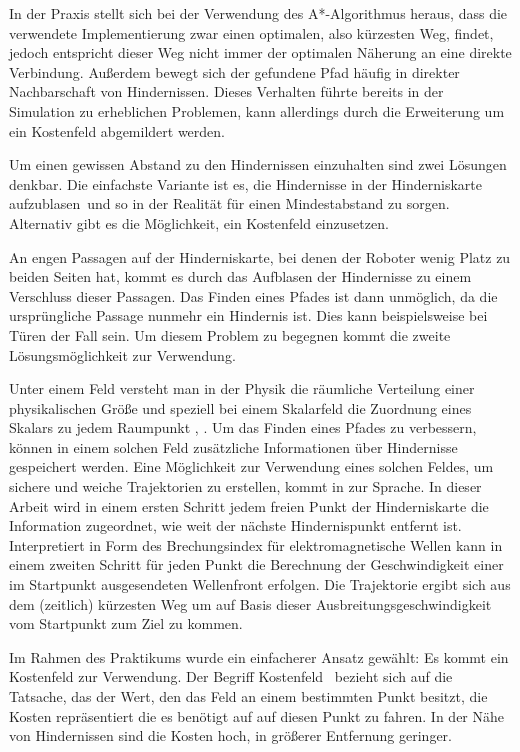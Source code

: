 In der Praxis stellt sich bei der Verwendung des A*-Algorithmus heraus, dass die verwendete Implementierung zwar einen optimalen, also kürzesten Weg, findet, jedoch entspricht dieser Weg nicht immer der optimalen Näherung an eine direkte Verbindung.
Außerdem bewegt sich der gefundene Pfad häufig in direkter Nachbarschaft von Hindernissen.
Dieses Verhalten führte bereits in der Simulation zu erheblichen Problemen, kann allerdings durch die Erweiterung um ein Kostenfeld abgemildert werden.

Um einen gewissen Abstand zu den Hindernissen einzuhalten sind zwei Lösungen denkbar.
Die einfachste Variante ist es, die Hindernisse in der Hinderniskarte \glqq aufzublasen\grqq\ und so in der Realität für einen Mindestabstand zu sorgen.
Alternativ gibt es die Möglichkeit, ein Kostenfeld einzusetzen. 

An engen Passagen auf der Hinderniskarte, bei denen der Roboter wenig Platz zu beiden Seiten hat, kommt es durch das Aufblasen der Hindernisse zu einem Verschluss dieser Passagen.
Das Finden eines Pfades ist dann unmöglich, da die ursprüngliche Passage nunmehr ein Hindernis ist.
Dies kann beispielsweise bei Türen der Fall sein.
Um diesem Problem zu begegnen kommt die zweite Lösungsmöglichkeit zur Verwendung.

Unter einem Feld versteht man in der Physik die räumliche Verteilung einer physikalischen Größe und speziell bei einem Skalarfeld die Zuordnung eines Skalars zu jedem Raumpunkt \cite{allgFeld}, \cite{skalarFeld}.
Um das Finden eines Pfades zu verbessern, können in einem solchen Feld zusätzliche Informationen über Hindernisse gespeichert werden.
Eine Möglichkeit zur Verwendung eines solchen Feldes, um sichere und weiche Trajektorien zu erstellen, kommt in \cite{Garrido2007} zur Sprache. In dieser Arbeit wird in einem ersten Schritt jedem freien Punkt der Hinderniskarte die Information zugeordnet, wie weit der nächste Hindernispunkt entfernt ist.
Interpretiert in Form des Brechungsindex für elektromagnetische Wellen kann in einem zweiten Schritt für jeden Punkt die Berechnung der Geschwindigkeit einer im Startpunkt ausgesendeten Wellenfront erfolgen.
Die Trajektorie ergibt sich aus dem (zeitlich) kürzesten Weg um auf Basis dieser Ausbreitungsgeschwindigkeit vom Startpunkt zum Ziel zu kommen.

Im Rahmen des Praktikums wurde ein einfacherer Ansatz gewählt:
Es kommt ein Kostenfeld zur Verwendung.
Der Begriff \glqq Kostenfeld \grqq\ bezieht sich auf die Tatsache, das der Wert, den das Feld an einem bestimmten Punkt besitzt, die Kosten repräsentiert die es benötigt auf auf diesen Punkt zu fahren.
In der Nähe von Hindernissen sind die Kosten hoch, in größerer Entfernung geringer.


